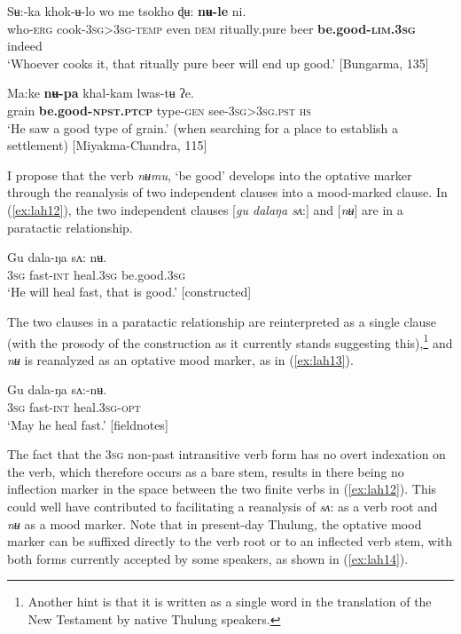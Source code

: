 \documentclass[output=paper,colorlinks,citecolor=brown,
]{langscibook}
\begin{document}
\ea\label{ex:lah10}
\gll Sʉ:-ka khok-ʉ-lo wo me tsokho ɖʉ: \textbf{nʉ-le} ni. \\
who-\textsc{erg} cook-\textsc{3sg>3sg-temp} even \textsc{dem} ritually.pure beer \textbf{be.good-\textsc{lim.3sg}} indeed \\
\glt `Whoever cooks it, that ritually pure beer will end up good.' [Bungarma, 135]
\z


\ea \label{ex:lah11}
\gll Ma:ke \textbf{nʉ-pa}  khal-kam lwas-tʉ ʔe. \\
grain \textbf{be.good-\textsc{npst.ptcp}} type-\textsc{gen} see-\textsc{3sg>3sg.pst} \textsc{hs} \\
\glt `He saw a good type of grain.' (when searching for a place to establish a settlement) [Miyakma-Chandra, 115]
\z

 I propose that the verb \textit{nʉmu}, `be good' develops into the optative marker through the reanalysis of two independent clauses into a mood-marked clause. In (\ref{ex:lah12}), the two independent clauses [\textit{gu dalaŋa sʌ}:] and [\textit{nʉ}] are in a paratactic relationship. 

\ea \label{ex:lah12}
\gll Gu dala-ŋa sʌ: nʉ. \\
\textsc{3sg} fast-\textsc{int} heal\textsc{.3sg} be.good.\textsc{3sg} \\
\glt `He will heal fast, that is good.' [constructed]
\z

 The two clauses in a paratactic relationship are reinterpreted as a single clause (with the prosody of the construction as it currently stands suggesting this),\footnote{Another hint is that it is written as a single word in the translation of the New Testament by native Thulung speakers.} and \textit{nʉ} is reanalyzed as an optative mood marker, as in (\ref{ex:lah13}).


\ea \label{ex:lah13}
\gll Gu dala-ŋa sʌ:-nʉ. \\
\textsc{3sg} fast\textsc{-int} heal.\textsc{3sg}-\textsc{opt} \\
\glt `May he heal fast.' [fieldnotes]
\z

 The fact that the \textsc{3sg} non-past intransitive verb form has no overt indexation on the verb, which therefore occurs as a bare stem, results in there being no inflection marker in the space between the two finite verbs in (\ref{ex:lah12}). This could well have contributed to facilitating a reanalysis of \textit{sʌ}: as a verb root and \textit{nʉ} as a mood marker. Note that in present-day Thulung, the optative mood marker can be suffixed directly to the verb root or to an inflected verb stem, with both forms currently accepted by some speakers, as shown in (\ref{ex:lah14}). 
\end{document}
